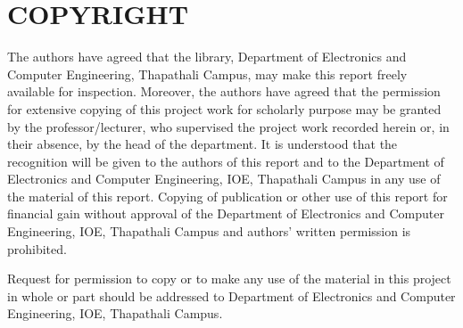 
\chapter*{\centering \textbf{COPYRIGHT}}

The authors have agreed that the library, Department of Electronics and
Computer Engineering, Thapathali Campus, may make this report freely available
for inspection. Moreover, the authors have agreed that the permission for
extensive copying of this project work for scholarly purpose may be granted by
the professor/lecturer, who supervised the project work recorded herein or, in
their absence, by the head of the department. It is understood that the
recognition will be given to the authors of this report and to the Department
of Electronics and Computer Engineering, IOE, Thapathali Campus in any use of
the material of this report. Copying of publication or other use of this report
for financial gain without approval of the Department of Electronics and
Computer Engineering, IOE, Thapathali Campus and authors' written permission is
prohibited.

Request for permission to copy or to make any use of the material in this
project in whole or part should be addressed to Department of Electronics and
Computer Engineering, IOE, Thapathali Campus.

\clearpage